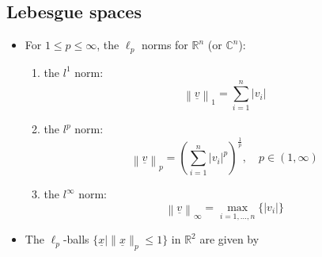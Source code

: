 \documentclass[11pt,twoside]{report}
\newcommand{\bbR}{{\mathbb{R}}}
\newcommand{\vecnot}{\underline}
\begin{document}
\subsection{Lebesgue spaces} 
\begin{itemize}


\item %
 For $1 \le p \le \infty$, the $\ell_p$ norms for $\mathbb{R}^n$ (or $\mathbb{C}^n$):
\begin{enumerate}
\item the $l^1$ norm: 
\[
\left\| \vecnot{v} \right\|_1 = \sum_{i=1}^n |v_i|
\]
\item the $l^p$ norm: 
\[
\left\| \vecnot{v} \right\|_p = \left( \sum_{i=1}^n |v_i|^p \right)^{\frac{1}{p}}, \quad p \in (1,\infty)
\]
\item the $l^{\infty}$ norm: 
\[
\left\| \vecnot{v} \right\|_{\infty} = \max_{i = 1,\ldots, n} \{ |v_i| \}
\]
\end{enumerate}
\item The $\ell_p$-balls $\{ \vecnot{x} \mid  \|\vecnot{x}\|_p \le 1\}$  in $\bbR^2$ are given by
\begin{center}
\end{center}
\end{itemize}
\end{document}
